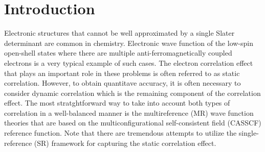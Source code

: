 \documentclass[aip,jcp,amsmath,twocolumn,floatfix,reprint,fleqn]{revtex4-1}
\begin{document}
\section{Introduction}
%
Electronic structures that cannot be well approximated by a single Slater determinant are common in chemistry.
%
Electronic wave function of the low-spin open-shell states where there are multiple anti-ferromagnetically coupled electrons is a very typical example of such cases.\cite{NEESE2009526}
%
The electron correlation effect that plays an important role in these problems is often referred to as static correlation.\cite{doi:10.1021/cr2001417}
%
However, to obtain quantitave accuracy, it is often necessary to consider dynamic correlation which is the remaining component of the correlation effect.
%
The most stratghtforward way to take into account both types of correlation in a well-balanced manner is the multireference (MR) wave function theories\cite{MCSCFandMRCI2011,doi:10.1021/cr300500z} that are based on the multiconfigurational self-consistent field (CASSCF) reference function.\cite{roosa1980,Roos1987,ruedenbergmcscf1979}
%
Note that there are tremendous attempts to utilize the single-reference (SR) framework\cite{doi:10.1063/1.481769,doi:10.1063/1.1290609,doi:10.1021/jp056791e,doi:10.1021/acs.jctc.9b00456,doi:10.1063/1.4991020,doi:10.1063/1.5053605,doi:10.1063/1.5085314,doi:10.1021/acs.jctc.6b00137,doi:10.1063/1.5036542,doi:10.1002/jcc.25163} for capturing the static correlation effect.
\end{document}
